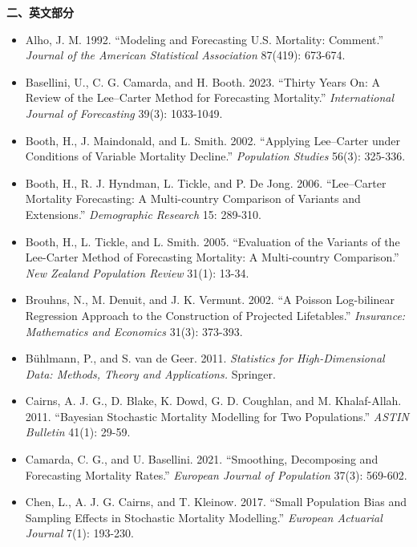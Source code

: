\documentclass[UTF8, fontset=macnew, a4paper, 12pt]{ctexart}
\begin{document}
\vspace{4pt}
\noindent\textbf{二、英文部分}
\begin{itemize}[leftmargin=2em, label={}, itemsep=3pt]
  \item[] Alho, J. M. 1992. ``Modeling and Forecasting U.S. Mortality:
        Comment.'' \textit{Journal of the American Statistical Association}
        87(419): 673-674.
  \item[] Basellini, U., C. G. Camarda, and H. Booth. 2023. ``Thirty Years On:
        A Review of the Lee--Carter Method for Forecasting Mortality.''
        \textit{International Journal of Forecasting} 39(3): 1033-1049.
  \item[] Booth, H., J. Maindonald, and L. Smith. 2002. ``Applying Lee--Carter
        under Conditions of Variable Mortality Decline.''
        \textit{Population Studies} 56(3): 325-336.
  \item[] Booth, H., R. J. Hyndman, L. Tickle, and P. De Jong. 2006.
        ``Lee--Carter Mortality Forecasting: A Multi-country Comparison of
        Variants and Extensions.'' \textit{Demographic Research} 15: 289-310.
  \item[] Booth, H., L. Tickle, and L. Smith. 2005. ``Evaluation of the
        Variants of the Lee-Carter Method of Forecasting Mortality:
        A Multi-country Comparison.''
        \textit{New Zealand Population Review} 31(1): 13-34.
  \item[] Brouhns, N., M. Denuit, and J. K. Vermunt. 2002. ``A Poisson
        Log-bilinear Regression Approach to the Construction of Projected
        Lifetables.'' \textit{Insurance: Mathematics and Economics}
        31(3): 373-393.
  \item[] B\"uhlmann, P., and S. van de Geer. 2011. \textit{Statistics for
        High-Dimensional Data: Methods, Theory and Applications.} Springer.
  \item[] Cairns, A. J. G., D. Blake, K. Dowd, G. D. Coughlan, and
        M. Khalaf-Allah. 2011. ``Bayesian Stochastic Mortality Modelling for
        Two Populations.'' \textit{ASTIN Bulletin} 41(1): 29-59.
  \item[] Camarda, C. G., and U. Basellini. 2021. ``Smoothing, Decomposing and
        Forecasting Mortality Rates.'' \textit{European Journal of Population}
        37(3): 569-602.
  \item[] Chen, L., A. J. G. Cairns, and T. Kleinow. 2017. ``Small Population
        Bias and Sampling Effects in Stochastic Mortality Modelling.''
        \textit{European Actuarial Journal} 7(1): 193-230.

\end{itemize}
\end{document}
